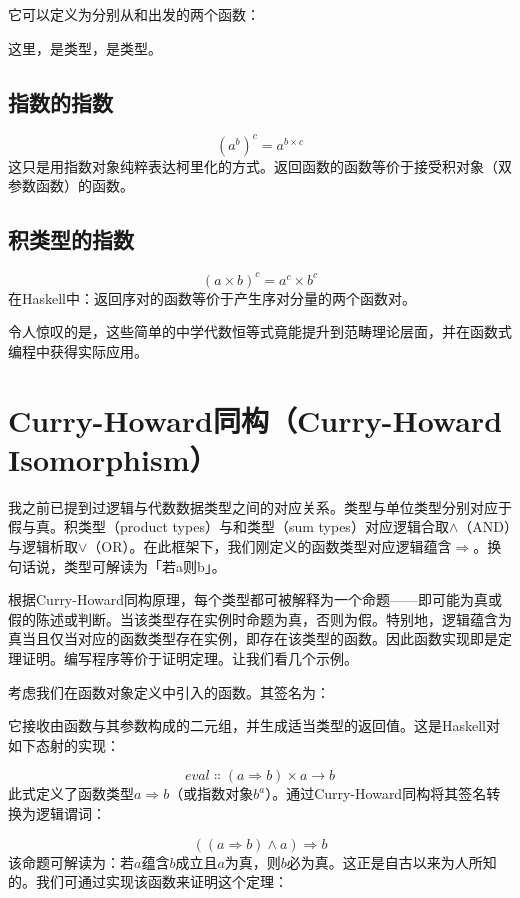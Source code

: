 它可以定义为分别从和出发的两个函数：

这里，是类型，是类型。

\subsection{指数的指数}

$$(a^{b})^{c} = a^{b \times c}$$
这只是用指数对象纯粹表达柯里化的方式。返回函数的函数等价于接受积对象（双参数函数）的函数。

\subsection{积类型的指数}

$$(a \times b)^{c} = a^{c} \times b^{c}$$
在Haskell中：返回序对的函数等价于产生序对分量的两个函数对。

令人惊叹的是，这些简单的中学代数恒等式竟能提升到范畴理论层面，并在函数式编程中获得实际应用。

\section{Curry-Howard同构（Curry-Howard Isomorphism）}

我之前已提到过逻辑与代数数据类型之间的对应关系。类型与单位类型\code{()}分别对应于假与真。积类型（product types）与和类型（sum types）对应逻辑合取$\wedge$（AND）与逻辑析取$\vee$（OR）。在此框架下，我们刚定义的函数类型对应逻辑蕴含$\Rightarrow$。换句话说，类型可解读为「若a则b」。

根据Curry-Howard同构原理，每个类型都可被解释为一个命题——即可能为真或假的陈述或判断。当该类型存在实例时命题为真，否则为假。特别地，逻辑蕴含为真当且仅当对应的函数类型存在实例，即存在该类型的函数。因此函数实现即是定理证明。编写程序等价于证明定理。让我们看几个示例。

考虑我们在函数对象定义中引入的函数。其签名为：

它接收由函数与其参数构成的二元组，并生成适当类型的返回值。这是Haskell对如下态射的实现：

$$\mathit{eval} \Colon (a \Rightarrow b) \times a \to b$$
此式定义了函数类型$a \Rightarrow b$（或指数对象$b^{a}$）。通过Curry-Howard同构将其签名转换为逻辑谓词：

$$((a \Rightarrow b) \wedge a) \Rightarrow b$$
该命题可解读为：若$a$蕴含$b$成立且$a$为真，则$b$必为真。这正是自古以来为人所知的。我们可通过实现该函数来证明这个定理：

